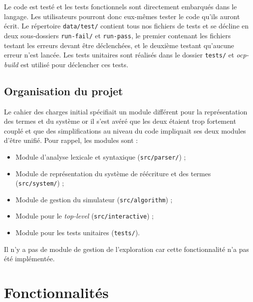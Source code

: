 \documentclass[12pt,a4paper]{article}
\begin{document}
Le code est testé et les tests fonctionnels sont directement embarqués dans le langage. Les utilisateurs pourront donc eux-mêmes tester le code qu'ils auront écrit. Le répertoire \verb=data/test/= contient tous nos fichiers de tests et se décline en deux sous-dossiers \verb=run-fail/= et \verb=run-pass=, le premier contenant les fichiers testant les erreurs devant être déclenchées, et le deuxième testant qu'aucune erreur n'est lancée. Les tests unitaires sont réalisés dans le dossier \verb=tests/= et \textit{ocp-build} est utilisé pour déclencher ces tests.

\subsection{Organisation du projet}

Le cahier des charges initial spécifiait un module différent pour la représentation des termes et du système or il s'est avéré que les deux étaient trop fortement couplé et que des simplifications au niveau du code impliquait ses deux modules d'être unifié. Pour rappel, les modules sont :

\begin{itemize}
\item Module d'analyse lexicale et syntaxique (\verb=src/parser/=) ;
\item Module de représentation du système de réécriture et des termes (\verb=src/system/=) ;
\item Module de gestion du simulateur (\verb=src/algorithm=) ;
\item Module pour le \textit{top-level} (\verb=src/interactive=) ;
\item Module pour les tests unitaires (\verb=tests/=).
\end{itemize}

Il n'y a pas de module de gestion de l'exploration car cette fonctionnalité n'a pas été implémentée.

\section{Fonctionnalités}
\end{document}
